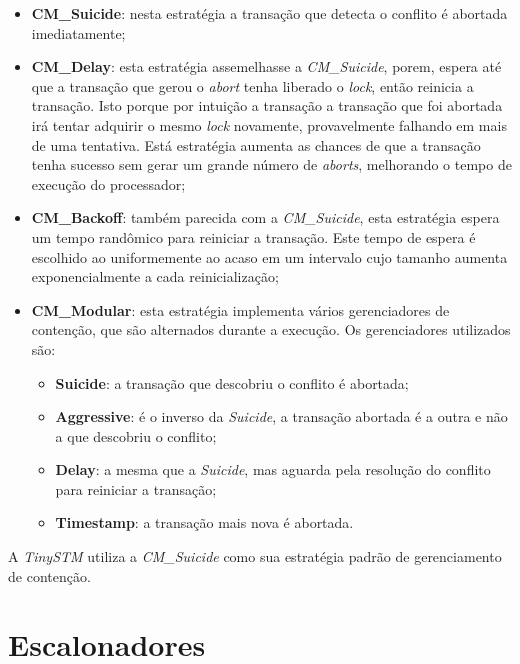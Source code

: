\documentclass[diss,capa]{texufpel}
\begin{document}
\begin{itemize}
 \item \textbf{CM\_Suicide}: nesta estratégia a transação que detecta o conflito é abortada imediatamente;

 \item \textbf{CM\_Delay}: esta estratégia assemelhasse a \emph{CM\_Suicide}, porem, espera até que a transação que gerou o \emph{abort} tenha liberado o \emph{lock}, então reinicia a transação. Isto porque por intuição a transação a transação que foi abortada irá tentar adquirir o mesmo \emph{lock} novamente, provavelmente falhando em mais de uma tentativa. Está estratégia aumenta as chances de que a transação tenha sucesso sem gerar um grande número de \emph{aborts}, melhorando o tempo de execução do processador;

 \item \textbf{CM\_Backoff}: também parecida com a \emph{CM\_Suicide}, esta estratégia espera um tempo randômico para reiniciar a transação. Este tempo de espera é escolhido ao uniformemente ao acaso em um intervalo cujo tamanho aumenta exponencialmente a cada reinicialização;

 \item \textbf{CM\_Modular}: esta estratégia implementa vários gerenciadores de contenção, que são alternados durante a execução. Os gerenciadores utilizados são:

    \begin{itemize}
       \item \textbf{Suicide}: a transação que descobriu o conflito é abortada;

       \item \textbf{Aggressive}: é o inverso da \emph{Suicide}, a transação abortada é a outra e não a que descobriu o conflito;

       \item \textbf{Delay}: a mesma que a \emph{Suicide}, mas aguarda pela resolução do conflito para reiniciar a transação;

       \item \textbf{Timestamp}: a transação mais nova é abortada.
    \end{itemize}

\end{itemize}

A \emph{TinySTM} utiliza a \emph{CM\_Suicide} como sua estratégia padrão de gerenciamento de contenção.



\chapter{Escalonadores}
\end{document}
